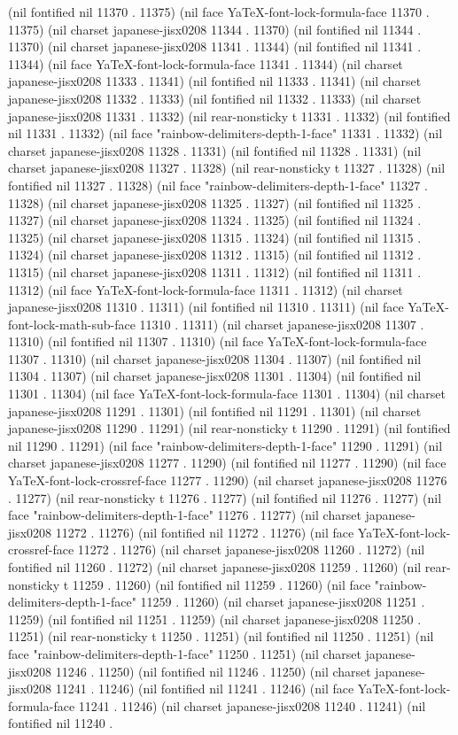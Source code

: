 (nil fontified nil 11370 . 11375) (nil face YaTeX-font-lock-formula-face 11370 . 11375) (nil charset japanese-jisx0208 11344 . 11370) (nil fontified nil 11344 . 11370) (nil charset japanese-jisx0208 11341 . 11344) (nil fontified nil 11341 . 11344) (nil face YaTeX-font-lock-formula-face 11341 . 11344) (nil charset japanese-jisx0208 11333 . 11341) (nil fontified nil 11333 . 11341) (nil charset japanese-jisx0208 11332 . 11333) (nil fontified nil 11332 . 11333) (nil charset japanese-jisx0208 11331 . 11332) (nil rear-nonsticky t 11331 . 11332) (nil fontified nil 11331 . 11332) (nil face "rainbow-delimiters-depth-1-face" 11331 . 11332) (nil charset japanese-jisx0208 11328 . 11331) (nil fontified nil 11328 . 11331) (nil charset japanese-jisx0208 11327 . 11328) (nil rear-nonsticky t 11327 . 11328) (nil fontified nil 11327 . 11328) (nil face "rainbow-delimiters-depth-1-face" 11327 . 11328) (nil charset japanese-jisx0208 11325 . 11327) (nil fontified nil 11325 . 11327) (nil charset japanese-jisx0208 11324 . 11325) (nil fontified nil 11324 . 11325) (nil charset japanese-jisx0208 11315 . 11324) (nil fontified nil 11315 . 11324) (nil charset japanese-jisx0208 11312 . 11315) (nil fontified nil 11312 . 11315) (nil charset japanese-jisx0208 11311 . 11312) (nil fontified nil 11311 . 11312) (nil face YaTeX-font-lock-formula-face 11311 . 11312) (nil charset japanese-jisx0208 11310 . 11311) (nil fontified nil 11310 . 11311) (nil face YaTeX-font-lock-math-sub-face 11310 . 11311) (nil charset japanese-jisx0208 11307 . 11310) (nil fontified nil 11307 . 11310) (nil face YaTeX-font-lock-formula-face 11307 . 11310) (nil charset japanese-jisx0208 11304 . 11307) (nil fontified nil 11304 . 11307) (nil charset japanese-jisx0208 11301 . 11304) (nil fontified nil 11301 . 11304) (nil face YaTeX-font-lock-formula-face 11301 . 11304) (nil charset japanese-jisx0208 11291 . 11301) (nil fontified nil 11291 . 11301) (nil charset japanese-jisx0208 11290 . 11291) (nil rear-nonsticky t 11290 . 11291) (nil fontified nil 11290 . 11291) (nil face "rainbow-delimiters-depth-1-face" 11290 . 11291) (nil charset japanese-jisx0208 11277 . 11290) (nil fontified nil 11277 . 11290) (nil face YaTeX-font-lock-crossref-face 11277 . 11290) (nil charset japanese-jisx0208 11276 . 11277) (nil rear-nonsticky t 11276 . 11277) (nil fontified nil 11276 . 11277) (nil face "rainbow-delimiters-depth-1-face" 11276 . 11277) (nil charset japanese-jisx0208 11272 . 11276) (nil fontified nil 11272 . 11276) (nil face YaTeX-font-lock-crossref-face 11272 . 11276) (nil charset japanese-jisx0208 11260 . 11272) (nil fontified nil 11260 . 11272) (nil charset japanese-jisx0208 11259 . 11260) (nil rear-nonsticky t 11259 . 11260) (nil fontified nil 11259 . 11260) (nil face "rainbow-delimiters-depth-1-face" 11259 . 11260) (nil charset japanese-jisx0208 11251 . 11259) (nil fontified nil 11251 . 11259) (nil charset japanese-jisx0208 11250 . 11251) (nil rear-nonsticky t 11250 . 11251) (nil fontified nil 11250 . 11251) (nil face "rainbow-delimiters-depth-1-face" 11250 . 11251) (nil charset japanese-jisx0208 11246 . 11250) (nil fontified nil 11246 . 11250) (nil charset japanese-jisx0208 11241 . 11246) (nil fontified nil 11241 . 11246) (nil face YaTeX-font-lock-formula-face 11241 . 11246) (nil charset japanese-jisx0208 11240 . 11241) (nil fontified nil 11240 . 
